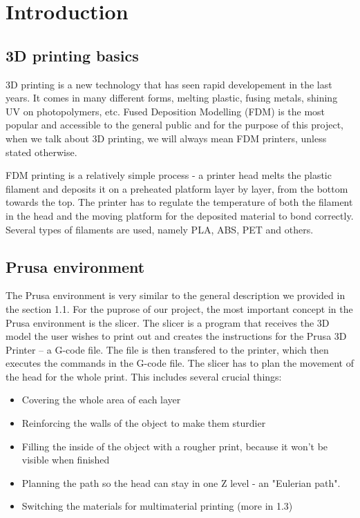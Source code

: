 \chapter{Introduction}

\section{3D printing basics}

3D printing is a new technology that has seen rapid developement in the last years. It comes in many different forms, melting plastic, fusing metals, shining UV on photopolymers, etc. Fused Deposition Modelling (FDM) is the most popular and accessible to the general public and for the purpose of this project, when we talk about 3D printing, we will always mean FDM printers, unless stated otherwise.

FDM printing is a relatively simple process - a printer head melts the plastic filament and deposits it on a preheated platform layer by layer, from the bottom towards the top. The printer has to regulate the temperature of both the filament in the head and the moving platform for the deposited material to bond correctly. Several types of filaments are used, namely PLA, ABS, PET and others.

\section{Prusa environment}

The Prusa environment is very similar to the general description we provided in the section 1.1. For the puprose of our project, the most important concept in the Prusa environment is the slicer. The slicer is a program that receives the 3D model the user wishes to print out and creates the instructions for the Prusa 3D Printer -- a G-code file. The file is then transfered to the printer, which then executes the commands in the G-code file. The slicer has to plan the movement of the head for the whole print. This includes several crucial things:

\begin{itemize}
\item Covering the whole area of each layer
\item Reinforcing the walls of the object to make them sturdier
\item Filling the inside of the object with a rougher print, because it won't be visible when finished
\item Planning the path so the head can stay in one Z level - an "Eulerian path".
\item Switching the materials for multimaterial printing (more in 1.3)
\end{itemize}

